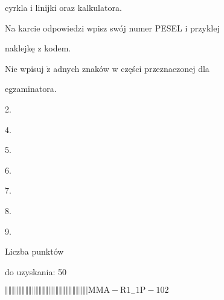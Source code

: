 \documentclass[a4paper,12pt]{article}
\begin{document}
cyrkla i linijki oraz kalkulatora.

Na karcie odpowiedzi wpisz swój numer PESEL i przyklej

naklejkę z kodem.

Nie wpisuj $\dot{\mathrm{z}}$ adnych znaków w części przeznaczonej dla

egzaminatora.

2.

4.

5.

6.

7.

8.

9.

Liczba punktów

do uzyskania: 50

$\Vert\Vert\Vert\Vert\Vert\Vert\Vert\Vert\Vert\Vert\Vert\Vert\Vert\Vert\Vert\Vert\Vert\Vert\Vert\Vert\Vert\Vert\Vert\Vert|  \mathrm{M}\mathrm{M}\mathrm{A}-\mathrm{R}1_{-}1\mathrm{P}-102$
\end{document}
